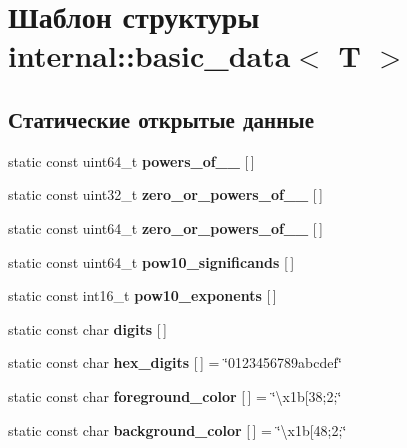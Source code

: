 \hypertarget{structinternal_1_1basic__data}{}\section{Шаблон структуры internal\+:\+:basic\+\_\+data$<$ T $>$}
\label{structinternal_1_1basic__data}
\subsection*{Статические открытые данные}
\begin{DoxyCompactItemize}
\item 
static const uint64\+\_\+t {\bfseries powers\+\_\+of\+\_\+\_} \mbox{[}$\,$\mbox{]}
\item 
static const uint32\+\_\+t {\bfseries zero\+\_\+or\+\_\+powers\+\_\+of\+\_\+\_} \mbox{[}$\,$\mbox{]}
\item 
static const uint64\+\_\+t {\bfseries zero\+\_\+or\+\_\+powers\+\_\+of\+\_\+\_} \mbox{[}$\,$\mbox{]}
\item 
\mbox{\label{structinternal_1_1basic__data_a81bc13bdd6aecf5abc7800ac9f034274}} 
static const uint64\+\_\+t {\bfseries pow10\+\_\+significands} \mbox{[}$\,$\mbox{]}
\item 
static const int16\+\_\+t {\bfseries pow10\+\_\+exponents} \mbox{[}$\,$\mbox{]}
\item 
static const char {\bfseries digits} \mbox{[}$\,$\mbox{]}
\item 
\mbox{\label{structinternal_1_1basic__data_afd2ae4259b9d03b654574086fd16dded}} 
static const char {\bfseries hex\+\_\+digits} \mbox{[}$\,$\mbox{]} = \char`\"{}0123456789abcdef\char`\"{}
\item 
\mbox{\label{structinternal_1_1basic__data_a4b5201038e9be02ba1b1f6d101c0562e}} 
static const char {\bfseries foreground\+\_\+color} \mbox{[}$\,$\mbox{]} = \char`\"{}\textbackslash{}x1b\mbox{[}38;2;\char`\"{}
\item 
\mbox{\label{structinternal_1_1basic__data_a616a85f0ca705395591cefdafbc849e7}} 
static const char {\bfseries background\+\_\+color} \mbox{[}$\,$\mbox{]} = \char`\"{}\textbackslash{}x1b\mbox{[}48;2;\char`\"{}

\end{DoxyCompactItemize}
